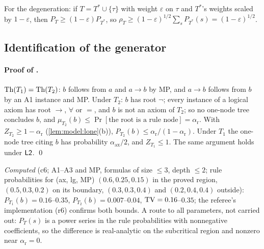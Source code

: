 For the degeneration: if $T=T^*\cup\{\tau\}$ with weight $\varepsilon$ on $\tau$ and $T^*$'s weights scaled by $1-\varepsilon$, then $P_T\ge(1-\varepsilon)P_{T^*}$, so $\rho_T\ge(1-\varepsilon)^{1/2}\sum_sP_{T^*}(s)=(1-\varepsilon)^{1/2}$.

\subsection{Identification of the generator}\label{app:ident:gen}

\paragraph{Proof of .} $\mathrm{Th}(T_1)=\mathrm{Th}(T_2)$: $b$ follows from $a$ and $a\to b$ by MP, and $a\to b$ follows from $b$ by an A1 instance and MP. Under $T_2$: $b$ has root $\neg$; every instance of a logical axiom has root $\to$, $\forall$ or $=$, and $b$ is not an axiom of $T_2$; so no one-node tree concludes $b$, and $\mu_{T_2}(b)\le\Pr[\text{the root is a rule node}]=\alpha_{\mathrm r}$. With $Z_{T_2}\ge1-\alpha_{\mathrm r}$ (\cref{lem:model:lone}(b)), $P_{T_2}(b)\le\alpha_{\mathrm r}/(1-\alpha_{\mathrm r})$. Under $T_1$ the one-node tree citing $b$ has probability $\alpha_{\mathrm{ax}}/2$, and $Z_{T_1}\le1$. The same argument holds under $\mathord{\mathsf{L2}}$. \qed

\emph{Computed} (c6; A1--A3 and MP, formulas of size $\le3$, depth $\le2$; rule probabilities for (ax, lg, MP) $(0.6,0.25,0.15)$ in the proved region, $(0.5,0.3,0.2)$ on its boundary, $(0.3,0.3,0.4)$ and $(0.2,0.4,0.4)$ outside): $P_{T_1}(b)=0.16$--$0.35$, $P_{T_2}(b)=0.007$--$0.04$, $\mathrm{TV}=0.16$--$0.35$; the referee's implementation (r6) confirms both bounds. A route to all parameters, not carried out: $P_T(s)$ is a power series in the rule probabilities with nonnegative coefficients, so the difference is real-analytic on the subcritical region and nonzero near $\alpha_{\mathrm r}=0$.

